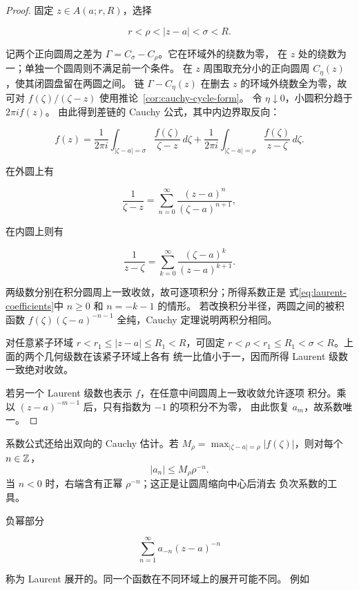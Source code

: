 \begin{proof}
固定 \(z\in A(a;r,R)\)，选择

\[
 r<\rho<|z-a|<\sigma<R.
\]

记两个正向圆周之差为 \(\Gamma=C_\sigma-C_\rho\)。它在环域外的绕数为零，
在 \(z\) 处的绕数为一；单独一个圆周则不满足前一个条件。
在 \(z\) 周围取充分小的正向圆周 \(C_\eta(z)\)，使其闭圆盘留在两圆之间。
链 \(\Gamma-C_\eta(z)\) 在删去 \(z\) 的环域外绕数全为零，故可对
\(f(\zeta)/(\zeta-z)\) 使用推论~\ref{cor:cauchy-cycle-form}。
令 \(\eta\downarrow0\)，小圆积分趋于 \(2\pi i f(z)\)。
由此得到差链的 Cauchy 公式，其中内边界取反向：

\[
 f(z)=\frac1{2\pi i}\int_{|\zeta-a|=\sigma}
 \frac{f(\zeta)}{\zeta-z}\,d\zeta
 +
 \frac1{2\pi i}\int_{|\zeta-a|=\rho}
 \frac{f(\zeta)}{z-\zeta}\,d\zeta.
\]

在外圆上有

\[
 \frac1{\zeta-z}
 =\sum_{n=0}^{\infty}\frac{(z-a)^n}{(\zeta-a)^{n+1}},
\]

在内圆上则有

\[
 \frac1{z-\zeta}
 =\sum_{k=0}^{\infty}\frac{(\zeta-a)^k}{(z-a)^{k+1}}.
\]

两级数分别在积分圆周上一致收敛，故可逐项积分；所得系数正是
式\eqref{eq:laurent-coefficients}中 \(n\ge0\) 和 \(n=-k-1\) 的情形。
若改换积分半径，两圆之间的被积函数
\(f(\zeta)(\zeta-a)^{-n-1}\) 全纯，Cauchy 定理说明两积分相同。

对任意紧子环域
\(r<r_1\le|z-a|\le R_1<R\)，可固定
\(r<\rho<r_1\le R_1<\sigma<R\)。上面的两个几何级数在该紧子环域上各有
统一比值小于一，因而所得 Laurent 级数一致绝对收敛。

若另一个 Laurent 级数也表示 \(f\)，在任意中间圆周上一致收敛允许逐项
积分。乘以 \((z-a)^{-m-1}\) 后，只有指数为 \(-1\) 的项积分不为零，
由此恢复 \(a_m\)，故系数唯一。
\end{proof}

系数公式还给出双向的 Cauchy 估计。若
\(M_\rho=\max_{|\zeta-a|=\rho}|f(\zeta)|\)，则对每个 \(n\in\mathbb{Z}\)，
\begin{equation}
 |a_n|\le M_\rho\rho^{-n}.
 \label{eq:laurent-coefficient-estimate}
\end{equation}
当 \(n<0\) 时，右端含有正幂 \(\rho^{-n}\)；这正是让圆周缩向中心后消去
负次系数的工具。

负幂部分

\[
 \sum_{n=1}^{\infty}a_{-n}(z-a)^{-n}
\]

称为 Laurent 展开的。同一个函数在不同环域上的展开可能不同。
例如

